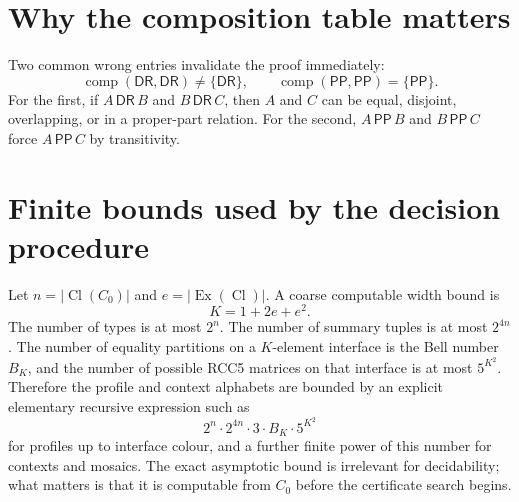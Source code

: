 \documentclass[11pt]{article}
\theoremstyle{remark}
\newcommand{\DR}{\mathsf{DR}}
\newcommand{\PP}{\mathsf{PP}}
\newcommand{\comp}{\operatorname{comp}}
\newcommand{\Cl}{\operatorname{Cl}}
\newcommand{\Ex}{\operatorname{Ex}}
\begin{document}
\section{Why the composition table matters}
Two common wrong entries invalidate the proof immediately:
\[
\comp(\DR,\DR)\ne\{\DR\},
\qquad
\comp(\PP,\PP)=\{\PP\}.
\]
For the first, if $A\,\DR\,B$ and $B\,\DR\,C$, then $A$ and $C$ can be equal, disjoint, overlapping, or in a proper-part relation.  For the second, $A\,\PP\,B$ and $B\,\PP\,C$ force $A\,\PP\,C$ by transitivity.

\section{Finite bounds used by the decision procedure}
Let $n=|\Cl(C_0)|$ and $e=|\Ex(\Cl)|$.  A coarse computable width bound is
\[
K=1+2e+e^2.
\]
The number of types is at most $2^n$.  The number of summary tuples is at most $2^{4n}$.  The number of equality partitions on a $K$-element interface is the Bell number $B_K$, and the number of possible RCC5 matrices on that interface is at most $5^{K^2}$.  Therefore the profile and context alphabets are bounded by an explicit elementary recursive expression such as
\[
2^n\cdot 2^{4n}\cdot 3\cdot B_K\cdot 5^{K^2}
\]
for profiles up to interface colour, and a further finite power of this number for contexts and mosaics.  The exact asymptotic bound is irrelevant for decidability; what matters is that it is computable from $C_0$ before the certificate search begins.
\end{document}
